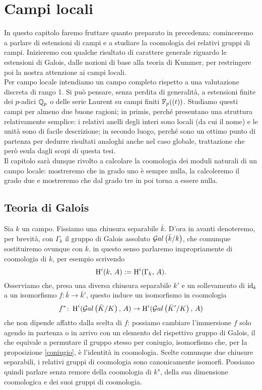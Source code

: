 \chapter{Campi locali}
In questo capitolo faremo fruttare quanto preparato in precedenza: cominceremo a parlare di estensioni di campi e a studiare la coomologia dei relativi gruppi di campi. Inizieremo con qualche risultato di carattere generale riguardo le estensioni di Galois, dalle nozioni di base alla teoria di Kummer, per restringere poi la nostra attenzione ai campi locali. \\

Per campo locale intendiamo un campo completo rispetto a una valutazione discreta di rango 1. Si può pensare, senza perdita di generalità, a estensioni finite dei $ p $-adici $ \mathbb{Q}_p $ o delle serie Laurent su campi finiti $ \mathbb{F}_p((t)) $. Studiamo questi campi per almeno due buone ragioni; in primis, perché presentano una struttura relativamente semplice: i relativi anelli degli interi sono locali (da cui il nome) e le unità sono di facile descrizione; in secondo luogo, perché sono un ottimo punto di partenza per dedurre risultati analoghi anche nel caso globale, trattazione che però esula dagli scopi di questa tesi. \\

Il capitolo sarà dunque rivolto a calcolare la coomologia dei moduli naturali di un campo locale: mostreremo che in grado uno è sempre nulla, la calcoleremo il grado due e mostreremo che dal grado tre in poi torna a essere nulla.


\section{Teoria di Galois}
Sia $ k $ un campo. Fissiamo una chiusura separabile $ \bar{k} $. D'ora in avanti denoteremo, per brevità, con $ \Gamma_k $ il gruppo di Galois assoluto $ \mathcal{G}al\left( \bar{k} / k \right) $, che comunque sostituiremo ovunque con $ k $. in questo senso parlaremo impropriamente di coomologia di $ k $, per esempio scrivendo
\[ \operatorname{H}^i(k, \, A) := \operatorname{H}^i(\Gamma_k, \, A). \]
Osserviamo che, presa una diversa chiusura separabile $ k' $ e un sollevamento di $ \operatorname{id}_{k} $ a un isomorfismo $ f\colon \bar{k} \to \bar{k}' $, questo induce un isomorfismo in coomologia
\[ f^* \colon \operatorname{H}^i(\mathcal{G}al\left( \bar{K} / K \right), \, A) \to \operatorname{H}^i(\mathcal{G}al\left( \bar{K}' / K \right), \, A) \]
che non dipende affatto dalla scelta di $ f $: possiamo cambiare l'immersione $ f $ solo agendo in partenza o in arrivo con un elemento del rispettivo gruppo di Galois, il che equivale a permutare il gruppo stesso per coniugio, isomorfismo che, per la proposizione \ref{coniugio}, è l'identità in coomologia. Scelte comunque due chiusure separabili, i relativi gruppi di coomologia sono canonicamente isomorfi. Possiamo quindi parlare senza remore della \leftquote coomologia di $ k $", della sua dimensione coomologica e dei suoi gruppi di coomologia. \\


